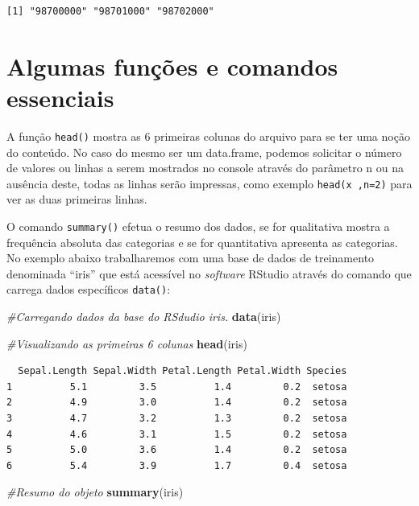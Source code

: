 \documentclass[12pt,brazil,oneside]{book}
\newenvironment{Shaded}{\begin{snugshade}}{\end{snugshade}}
\newcommand{\CommentTok}[1]{\textcolor[rgb]{0.56,0.35,0.01}{\textit{#1}}}
\newcommand{\KeywordTok}[1]{\textcolor[rgb]{0.13,0.29,0.53}{\textbf{#1}}}
\newcommand{\NormalTok}[1]{#1}
\begin{document}
\begin{verbatim}
[1] "98700000" "98701000" "98702000"
\end{verbatim}

\hypertarget{algumas-funcoes-e-comandos-essenciais}{%
\section{Algumas funções e comandos essenciais}\label{algumas-funcoes-e-comandos-essenciais}}

A função \texttt{head()} mostra as 6 primeiras colunas do arquivo para se ter uma noção do conteúdo. No caso do mesmo ser um data.frame, podemos solicitar o número de valores ou linhas a serem mostrados no console através do parâmetro n ou na ausência deste, todas as linhas serão impressas, como exemplo \texttt{head(x\ ,n=2)} para ver as duas primeiras linhas.

O comando \texttt{summary()} efetua o resumo dos dados, se for qualitativa mostra a frequência absoluta das categorias e se for quantitativa apresenta as categorias. No exemplo abaixo trabalharemos com uma base de dados de treinamento denominada ``iris'' que está acessível no \emph{software} RStudio através do comando que carrega dados específicos \texttt{data()}:

\begin{Shaded}
\begin{Highlighting}[]
\CommentTok{#Carregando dados da base do RSdudio iris.}
\KeywordTok{data}\NormalTok{(iris)}

\CommentTok{#Visualizando as primeiras 6 colunas}
\KeywordTok{head}\NormalTok{(iris)}
\end{Highlighting}
\end{Shaded}

\begin{verbatim}
  Sepal.Length Sepal.Width Petal.Length Petal.Width Species
1          5.1         3.5          1.4         0.2  setosa
2          4.9         3.0          1.4         0.2  setosa
3          4.7         3.2          1.3         0.2  setosa
4          4.6         3.1          1.5         0.2  setosa
5          5.0         3.6          1.4         0.2  setosa
6          5.4         3.9          1.7         0.4  setosa
\end{verbatim}

\begin{Shaded}
\begin{Highlighting}[]
\CommentTok{#Resumo do objeto}
\KeywordTok{summary}\NormalTok{(iris)}
\end{Highlighting}
\end{Shaded}
\end{document}
